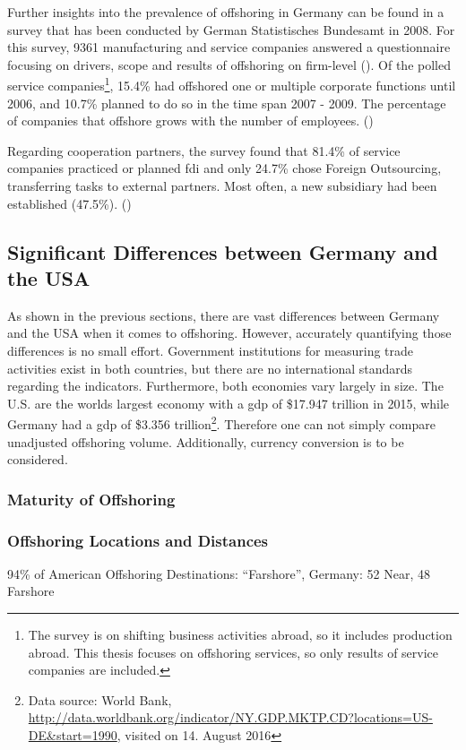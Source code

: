 Further insights into the prevalence of offshoring in Germany can be found in a survey that has been conducted by German Statistisches Bundesamt in 2008. For this survey, 9361 manufacturing and service companies answered a questionnaire focusing on drivers, scope and results of offshoring on firm-level (\cite[p. 7]{StatistischesBundesamt.2008}). Of the polled service companies\footnote{The survey is on shifting business activities abroad, so it includes production abroad. This thesis focuses on offshoring services, so only results of service companies are included.}, 15.4\% had offshored one or multiple corporate functions until 2006, and 10.7\% planned to do so in the time span 2007 - 2009. The percentage of companies that offshore grows with the number of employees. (\cite[p. 11]{StatistischesBundesamt.2008})

Regarding cooperation partners, the survey found that 81.4\% of service companies practiced or planned \gls{fdi} and only 24.7\% chose Foreign Outsourcing, transferring tasks to external partners. Most often, a new subsidiary had been established (47.5\%). (\cite[p. 18]{StatistischesBundesamt.2008})



\subsection{Significant Differences between Germany and the USA}
\label{sec:DifferencesUSGER}
As shown in the previous sections, there are vast differences between Germany and the USA when it comes to offshoring. However, accurately quantifying those differences is no small effort. Government institutions for measuring trade activities exist in both countries, but there are no international standards regarding the indicators. Furthermore, both economies vary largely in size. The U.S. are the worlds largest economy with a \gls{gdp} of \$17.947 trillion in 2015, while Germany had a \gls{gdp} of \$3.356 trillion\footnote{Data source: World Bank, \url{http://data.worldbank.org/indicator/NY.GDP.MKTP.CD?locations=US-DE&start=1990}, visited on 14. August 2016}. Therefore one can not simply compare unadjusted offshoring volume. Additionally, currency conversion is to be considered. 

\subsubsection{Maturity of Offshoring}

\subsubsection{Offshoring Locations and Distances}
94\% of American Offshoring Destinations: ``Farshore'', Germany: 52 Near, 48 Farshore \cite[pp. 175f]{Hutzschenreuter.2007}
